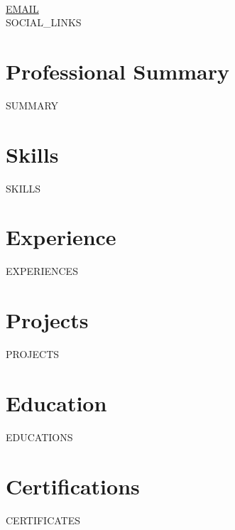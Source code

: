 \documentclass[10pt, a4paper]{article}
\begin{document}
\setlength{\parskip}{4pt}

\begin{center}
  {\fontsize{26}{28}\selectfont\bfseries{}}\\[4pt]
  \textcolor{muted}{\small
    \href{mailto:{{EMAIL}}}{{{EMAIL}}}
    \quad\textbullet{}
    \quad\textbullet{}
  }\\[2pt]
  {{SOCIAL_LINKS}}
\end{center}

\vspace{4pt}

\section{Professional Summary}
\textcolor{dark}{{{SUMMARY}}}

\section{Skills}
{{SKILLS}}

\section{Experience}
{{EXPERIENCES}}

\section{Projects}
{{PROJECTS}}

\section{Education}
{{EDUCATIONS}}

\section{Certifications}
{{CERTIFICATES}}
\end{document}
